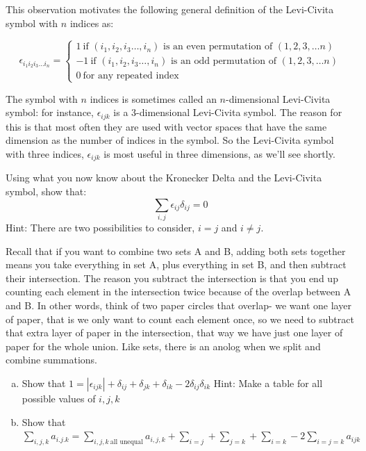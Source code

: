 This observation motivates the following general definition  of the {\bfi Levi-Civita symbol} with $n$ indices as:

\[ \epsilon_{i_1 i_2 i_3…i_n}=
\begin{cases}
1 ~ \text{if $(i_1,i_2,i_3…,i_n)$ is an even permutation of $(1,2,3, \ldots n)$}\\
-1 ~ \text{if $(i_1,i_2,i_3…,i_n)$ is an odd permutation of $(1,2,3, \ldots n)$}\\
0 ~ \text{for any repeated index}
\end{cases} \]

The symbol with $n$ indices is sometimes called an $n$-dimensional Levi-Civita symbol: for instance, $\epsilon_{ijk}$ is a 3-dimensional Levi-Civita symbol.  The reason for this is that most often they are used with vector spaces that have the same dimension as the number of indices in the symbol.  So   the Levi-Civita symbol with three indices, $\epsilon_{ijk}$ is most useful in three dimensions, as we'll see shortly.

\begin{exercise}{}
Using what you now know about the Kronecker Delta and the Levi-Civita symbol, show that:
\[
\sum_{i,j} \epsilon_{ij} \delta_{ij}=0
\]
Hint: There are two possibilities to consider, $i=j$ and $i \neq j$.
\end{exercise}

Recall that if you want to combine two sets A and B, adding both sets together means you take everything in set A, plus everything in set B, and then subtract their intersection.  The reason you subtract the intersection is that you end up counting each element in the intersection twice because of the overlap between A and B.  In other words, think of two paper circles that overlap- we want one layer of paper, that is we only want to count each element once, so we need to subtract that extra layer of paper in the intersection, that way we have just one layer of paper for the whole union.  Like sets, there is an anolog when we split and combine summations.  
\begin{exercise}{}
\begin{enumerate}[(a)]
\item
Show that $1=|\epsilon_{ijk}|+\delta_{ij}+\delta_{jk}+\delta_{ik}-2\delta_{ij}\delta_{ik}$ Hint: Make a table for all possible values of $i,j,k$
\item
Show that $\sum_{i,j,k} a_{i.j.k}=\sum_{i,j,k~\text{all unequal}}a_{i,j,k}+\sum_{i=j}+\sum_{j=k}+\sum_{i=k}-2\sum_{i=j=k}a_{ijk}$
\end{enumerate}
\end{exercise}

